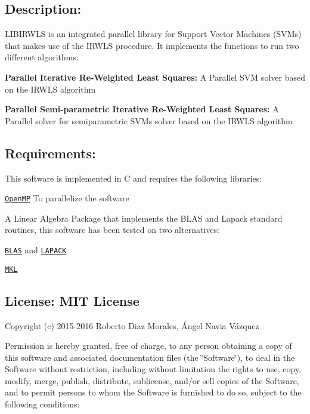 \subsection*{Description\+: }

L\+I\+B\+I\+R\+W\+LS is an integrated parallel library for Support Vector Machines (S\+V\+Ms) that makes use of the I\+R\+W\+LS procedure. It implements the functions to run two different algorithms\+:

{\bfseries Parallel Iterative Re-\/\+Weighted Least Squares\+:} A Parallel S\+VM solver based on the I\+R\+W\+LS algorithm

{\bfseries Parallel Semi-\/parametric Iterative Re-\/\+Weighted Least Squares\+:} A Parallel solver for semiparametric S\+V\+Ms solver based on the I\+R\+W\+LS algorithm

\subsection*{Requirements\+: }

This software is implemented in C and requires the following libraries\+:


\begin{DoxyItemize}
\item \href{http://openmp.org/wp/}{\tt Open\+MP} To parallelize the software
\item A Linear Algebra Package that implements the B\+L\+AS and Lapack standard routines, this software has been tested on two alternatives\+:
\begin{DoxyItemize}
\item \href{http://www.netlib.org/blas/}{\tt B\+L\+AS} and \href{http://www.netlib.org/lapack/}{\tt L\+A\+P\+A\+CK}
\item \href{https://software.intel.com/en-us/intel-mkl}{\tt M\+KL}
\end{DoxyItemize}
\end{DoxyItemize}

\subsection*{License\+: M\+IT License }

Copyright (c) 2015-\/2016 Roberto Diaz Morales, Ángel Navia Vázquez

Permission is hereby granted, free of charge, to any person obtaining a copy of this software and associated documentation files (the \char`\"{}\+Software\char`\"{}), to deal in the Software without restriction, including without limitation the rights to use, copy, modify, merge, publish, distribute, sublicense, and/or sell copies of the Software, and to permit persons to whom the Software is furnished to do so, subject to the following conditions\+:

